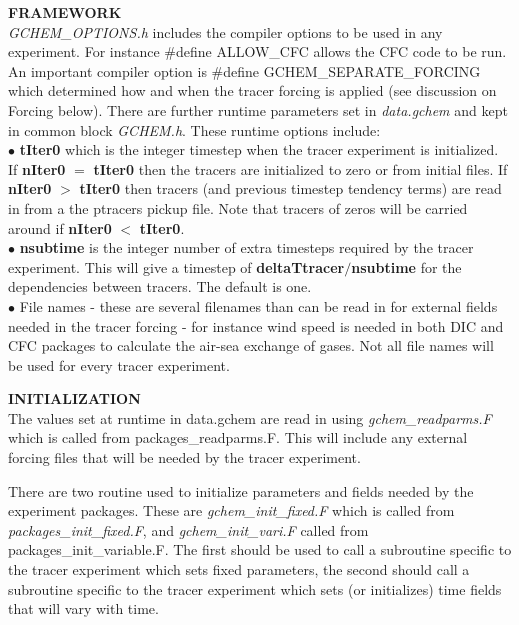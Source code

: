 \noindent
{{\bf FRAMEWORK}} \\
{\it GCHEM\_OPTIONS.h} includes the compiler options to be used
in any experiment. For instance \#define ALLOW\_CFC allows
the CFC code to be run. An important compiler option is
 \#define GCHEM\_SEPARATE\_FORCING which determined 
how and when the tracer forcing is applied (see discussion
on Forcing below).
 There are further runtime parameters
set in {\it data.gchem} and kept in common block {\it GCHEM.h}.
These runtime options include:\\
$\bullet$ {\bf tIter0} which is the integer timestep when the tracer experiment
 is initialized. If {\bf nIter0} $=$ {\bf tIter0} then the tracers
 are initialized to zero or from initial files. If {\bf nIter0} $>$
 {\bf tIter0} then tracers (and previous timestep tendency terms)
  are read in from a the ptracers pickup file. Note that tracers
  of zeros will be carried around if {\bf nIter0} $<$ {\bf tIter0}.
\\
$\bullet$ {\bf nsubtime} is the integer number of extra timesteps
 required by the tracer experiment. This will give a timestep
 of {\bf deltaTtracer}$/${\bf nsubtime} for the dependencies
 between tracers. The default is one.
\\
$\bullet$ File names - these are several filenames than can be read in
 for external fields needed in the tracer forcing - for instance
 wind speed is needed in both DIC and CFC packages to calculate
 the air-sea exchange of gases. Not all file names will be used 
 for every tracer experiment. 

\vspace{.5cm}

\noindent
{{\bf INITIALIZATION}}\\
The values set at runtime in data.gchem are read in
using {\it gchem\_readparms.F} which is called from
packages\_readparms.F. This will include any external
forcing files that will be needed by the tracer experiment.

There are two routine used to initialize parameters and fields
needed by the experiment packages. These are
{\it gchem\_init\_fixed.F} which is called from \textit{packages\_init\_fixed.F}, and
{\it gchem\_init\_vari.F} called from 
packages\_init\_variable.F. The first should
be used to call a subroutine specific to the tracer experiment
which sets fixed parameters, the second should call a subroutine
specific to the tracer experiment
which sets (or initializes) time fields that will vary with time.

\vspace{.5cm}



